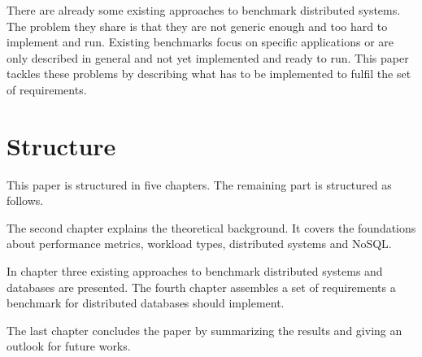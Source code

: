 There are already some existing approaches to benchmark distributed systems. The problem they share is that they are not generic enough and too hard to implement and run. Existing benchmarks focus on specific applications or are only described in general and not yet implemented and ready to run. This paper tackles these problems by describing what has to be implemented to fulfil the set of requirements.


\section{Structure}
\label{sec:structure}
This paper is structured in five chapters. The remaining part is structured as follows.

The second chapter explains the theoretical background. It covers the foundations about performance metrics, workload types, distributed systems and NoSQL.

In chapter three existing approaches to benchmark distributed systems and databases are presented. The fourth chapter assembles a set of requirements a benchmark for distributed databases should implement.

The last chapter concludes the paper by summarizing the results and giving an outlook for future works.
